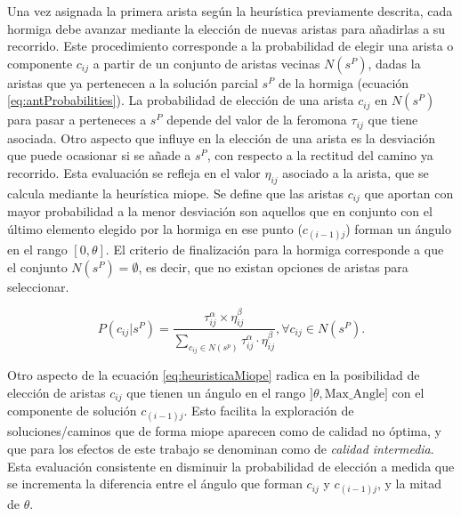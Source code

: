 Una vez asignada la primera arista seg\'un la heur\'istica previamente descrita, cada hormiga debe avanzar mediante la elecci\'on de nuevas aristas para a\~nadirlas a su recorrido. Este procedimiento corresponde a la probabilidad de elegir una arista o componente $c_{ij}$ a partir de un conjunto de aristas vecinas $N(s^{P})$, dadas la aristas que ya pertenecen a la soluci\'on parcial $s^P$ de la hormiga (ecuaci\'on \eqref{eq:antProbabilities}). La probabilidad de elecci\'on de una arista $c_{ij}$ en $N(s^{P})$ para pasar a perteneces a $s^P$ depende del valor de la feromona $\tau_{ij}$ que tiene asociada. Otro aspecto que influye en la elecci\'on de una arista es la desviaci\'on que puede ocasionar si se a\~nade a $s^P$, con respecto a la rectitud del camino ya recorrido. Esta evaluaci\'on se refleja en el valor $\eta_{ij}$ asociado a la arista, que se calcula mediante la heur\'istica miope. 
Se define que las aristas $c_{ij}$ que aportan con mayor probabilidad a la menor desviaci\'on son aquellos que en conjunto con el \'ultimo elemento elegido por la hormiga en ese punto ($c_{(i-1)j}$) forman un \'angulo en el rango $[0, \theta]$. El criterio de finalizaci\'on para la hormiga corresponde a que el conjunto $N(s^{P}) = \emptyset$, es decir, que no existan opciones de aristas para seleccionar.

\begin{equation}
P(c_{ij} | s^{P}) = \frac
        {\tau_{ij}^{\alpha} \times \eta_{ij}^{\beta}}
        {\sum\limits_{c_{ij}\in N(s^p)}{\tau_{ij}^{\alpha} \cdot \eta_{ij}^{\beta} } }, \forall c_{ij} \in N(s^{P}).
\label{eq:antProbabilities}
\end{equation}

Otro aspecto de la ecuaci\'on \eqref{eq:heuristicaMiope} radica en la posibilidad de elecci\'on de aristas $c_{ij}$ que tienen un \'angulo en el rango $]\theta, \text{Max\_Angle}]$ con el componente de soluci\'on $c_{(i-1)j}$. Esto facilita la exploraci\'on de soluciones/caminos que de forma miope aparecen como de calidad no \'optima, y que para los efectos de este trabajo se denominan como de {\it calidad intermedia}. Esta evaluaci\'on consistente en disminuir la probabilidad de elecci\'on a medida que se incrementa la diferencia entre el \'angulo que forman $c_{ij}$ y $c_{(i-1)j}$, y la mitad de $\theta$.


